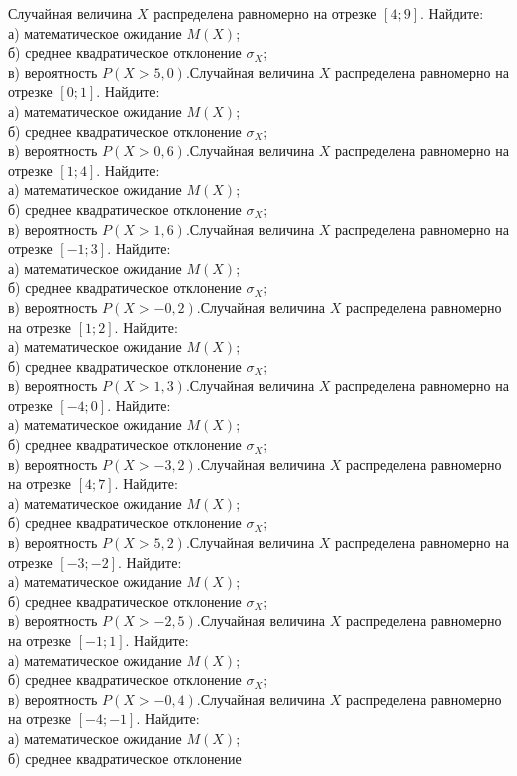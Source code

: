 

\z Случайная величина $X$ распределена равномерно на отрезке $[4; 9]$. Найдите: \\ \quad а) математическое ожидание $M(X)$; \\ \quad б) среднее квадратическое отклонение $\sigma_X$; \\ \quad в) вероятность $P(X>5{,}0)$.Случайная величина $X$ распределена равномерно на отрезке $[0; 1]$. Найдите: \\ \quad а) математическое ожидание $M(X)$; \\ \quad б) среднее квадратическое отклонение $\sigma_X$; \\ \quad в) вероятность $P(X>0{,}6)$.Случайная величина $X$ распределена равномерно на отрезке $[1; 4]$. Найдите: \\ \quad а) математическое ожидание $M(X)$; \\ \quad б) среднее квадратическое отклонение $\sigma_X$; \\ \quad в) вероятность $P(X>1{,}6)$.Случайная величина $X$ распределена равномерно на отрезке $[-1; 3]$. Найдите: \\ \quad а) математическое ожидание $M(X)$; \\ \quad б) среднее квадратическое отклонение $\sigma_X$; \\ \quad в) вероятность $P(X>-0{,}2)$.Случайная величина $X$ распределена равномерно на отрезке $[1; 2]$. Найдите: \\ \quad а) математическое ожидание $M(X)$; \\ \quad б) среднее квадратическое отклонение $\sigma_X$; \\ \quad в) вероятность $P(X>1{,}3)$.Случайная величина $X$ распределена равномерно на отрезке $[-4; 0]$. Найдите: \\ \quad а) математическое ожидание $M(X)$; \\ \quad б) среднее квадратическое отклонение $\sigma_X$; \\ \quad в) вероятность $P(X>-3{,}2)$.Случайная величина $X$ распределена равномерно на отрезке $[4; 7]$. Найдите: \\ \quad а) математическое ожидание $M(X)$; \\ \quad б) среднее квадратическое отклонение $\sigma_X$; \\ \quad в) вероятность $P(X>5{,}2)$.Случайная величина $X$ распределена равномерно на отрезке $[-3; -2]$. Найдите: \\ \quad а) математическое ожидание $M(X)$; \\ \quad б) среднее квадратическое отклонение $\sigma_X$; \\ \quad в) вероятность $P(X>-2{,}5)$.Случайная величина $X$ распределена равномерно на отрезке $[-1; 1]$. Найдите: \\ \quad а) математическое ожидание $M(X)$; \\ \quad б) среднее квадратическое отклонение $\sigma_X$; \\ \quad в) вероятность $P(X>-0{,}4)$.Случайная величина $X$ распределена равномерно на отрезке $[-4; -1]$. Найдите: \\ \quad а) математическое ожидание $M(X)$; \\ \quad б) среднее квадратическое отклонение 